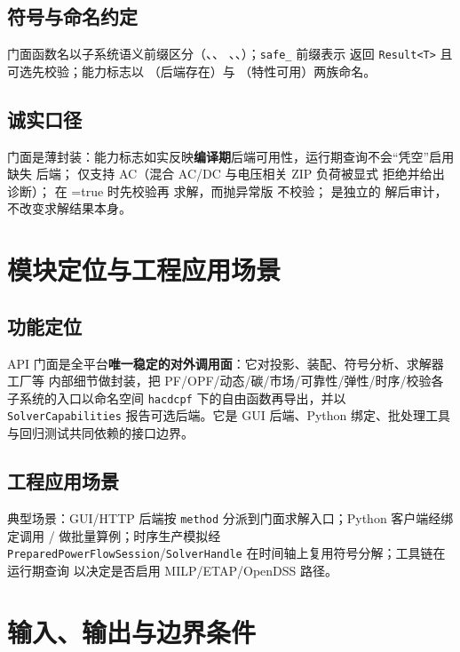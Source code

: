\documentclass[UTF8,fontset=fandol,a4paper,11pt]{ctexart}
\begin{document}
\subsection{符号与命名约定}
门面函数名以子系统语义前缀区分（、、
、、）；\texttt{safe\_} 前缀表示
返回 \texttt{Result<T>} 且可选先校验；能力标志以 （后端存在）与
（特性可用）两族命名。

\subsection{诚实口径}
门面是薄封装：能力标志如实反映\textbf{编译期}后端可用性，运行期查询不会“凭空”启用缺失
后端； 仅支持 AC（混合 AC/DC 与电压相关 ZIP 负荷被显式
拒绝并给出诊断）； 在 =true 时先校验再
求解，而抛异常版  不校验； 是独立的
解后审计，不改变求解结果本身。

\section{模块定位与工程应用场景}
\subsection{功能定位}
API 门面是全平台\textbf{唯一稳定的对外调用面}：它对投影、装配、符号分析、求解器工厂等
内部细节做封装，把 PF/OPF/动态/碳/市场/可靠性/弹性/时序/校验各子系统的入口以命名空间
\texttt{hacdcpf} 下的自由函数再导出，并以 \texttt{SolverCapabilities} 报告可选后端。它是
GUI 后端、Python 绑定、批处理工具与回归测试共同依赖的接口边界。

\subsection{工程应用场景}
典型场景：GUI/HTTP 后端按 \texttt{method} 分派到门面求解入口；Python 客户端经绑定调用
/ 做批量算例；时序生产模拟经
\texttt{PreparedPowerFlowSession}/\texttt{SolverHandle} 在时间轴上复用符号分解；工具链在
运行期查询  以决定是否启用 MILP/ETAP/OpenDSS 路径。

\section{输入、输出与边界条件}
\end{document}
